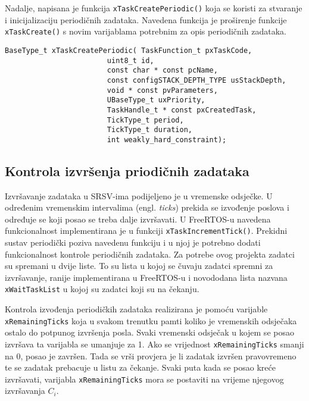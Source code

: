 \documentclass[../zavrsni.tex]{subfiles}
\begin{document}
Nadalje, napisana je funkcija \texttt{xTaskCreatePeriodic()} koja se koristi za stvaranje i inicijalizaciju periodičnih zadataka.
Navedena funkcija je proširenje funkcije \texttt{xTaskCreate()} s novim varijablama potrebnim za opis periodičnih zadataka.

\begin{lstlisting}[style=CStyle,caption={Prototip funkcije \texttt{xTaskCreatePeriodic()}},captionpos=b]
BaseType_t xTaskCreatePeriodic( TaskFunction_t pxTaskCode,
                        uint8_t id,
                        const char * const pcName, 
                        const configSTACK_DEPTH_TYPE usStackDepth,
                        void * const pvParameters,
                        UBaseType_t uxPriority,
                        TaskHandle_t * const pxCreatedTask,
                        TickType_t period,
                        TickType_t duration,
                        int weakly_hard_constraint);
\end{lstlisting} 

\subsection{Kontrola izvršenja priodičnih zadataka}

Izvršavanje zadataka u SRSV-ima podijeljeno je u vremenske odsječke. U određenim vremenskim intervalima (engl. \textit{ticks}) prekida se izvođenje poslova i 
određuje se koji posao se treba dalje izvršavati.
U FreeRTOS-u navedena funkcionalnost implementirana je u funkciji \texttt{xTaskIncrementTick()}. Prekidni sustav periodički poziva navedenu funkciju 
i u njoj je potrebno dodati funkcionalnost kontrole periodičnih zadataka.
Za potrebe ovog projekta zadatci su spremani u dvije liste. To su lista u kojoj se čuvaju zadatci spremni za izvršavanje, ranije 
implementirana u FreeRTOS-u i novododana lista nazvana \texttt{xWaitTaskList} u kojoj su zadatci koji su na čekanju. 

Kontrola izvođenja periodičkih zadataka realizirana je pomoću varijable \texttt{xRemainingTicks} koja u svakom trenutku pamti 
koliko je vremenskih odsječaka ostalo do potpunog izvršenja posla.
Svaki vremenski odsječak u kojem se posao izvršava ta varijabla se umanjuje za 1. Ako se vrijednost \texttt{xRemainingTicks} smanji na 0, 
posao je završen. Tada se vrši provjera je li zadatak izvršen pravovremeno te se zadatak prebacuje u listu za čekanje.
Svaki puta kada se posao kreće izvršavati, varijabla \texttt{xRemainingTicks} mora se postaviti na vrijeme njegovog izvršavanja $C_i$.
\end{document}
